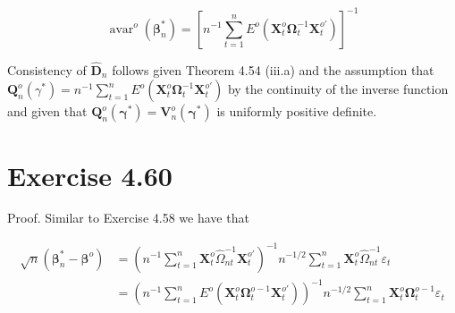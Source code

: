 \documentclass[10pt]{article}
\begin{document}
$$
\operatorname{avar}^{o}\left(\boldsymbol{\beta}_{n}^{*}\right)=\left[n^{-1} \sum_{t=1}^{n} E^{o}\left(\mathbf{X}_{t}^{o} \boldsymbol{\Omega}_{t}^{-1} \mathbf{X}_{t}^{o \prime}\right)\right]^{-1}
$$

Consistency of $\hat{\mathbf{D}}_{n}$ follows given Theorem 4.54 (iii.a) and the assumption that $\mathbf{Q}_{n}^{o}\left(\gamma^{*}\right)=n^{-1} \sum_{t=1}^{n} E^{o}\left(\mathbf{X}_{t}^{o} \boldsymbol{\Omega}_{t}^{-1} \mathbf{X}_{t}^{o \prime}\right)$ by the continuity of the inverse function and given that $\mathbf{Q}_{n}^{o}\left(\boldsymbol{\gamma}^{*}\right)=\mathbf{V}_{n}^{o}\left(\boldsymbol{\gamma}^{*}\right)$ is uniformly positive definite.

\section*{Exercise 4.60}
Proof. Similar to Exercise 4.58 we have that

$$
\begin{aligned}
\sqrt{n}\left(\boldsymbol{\beta}_{n}^{*}-\boldsymbol{\beta}^{o}\right) & =\left(n^{-1} \sum_{t=1}^{n} \mathbf{X}_{t}^{o} \hat{\Omega}_{n t}^{-1} \mathbf{X}_{t}^{o \prime}\right)^{-1} n^{-1 / 2} \sum_{t=1}^{n} \mathbf{X}_{t}^{o} \hat{\Omega}_{n t}^{-1} \varepsilon_{t} \\
& =\left(n^{-1} \sum_{t=1}^{n} E^{o}\left(\mathbf{X}_{t}^{o} \boldsymbol{\Omega}_{t}^{o-1} \mathbf{X}_{t}^{o \prime}\right)\right)^{-1} n^{-1 / 2} \sum_{t=1}^{n} \mathbf{X}_{t}^{o} \boldsymbol{\Omega}_{t}^{o-1} \varepsilon_{t}
\end{aligned}
$$
\end{document}
